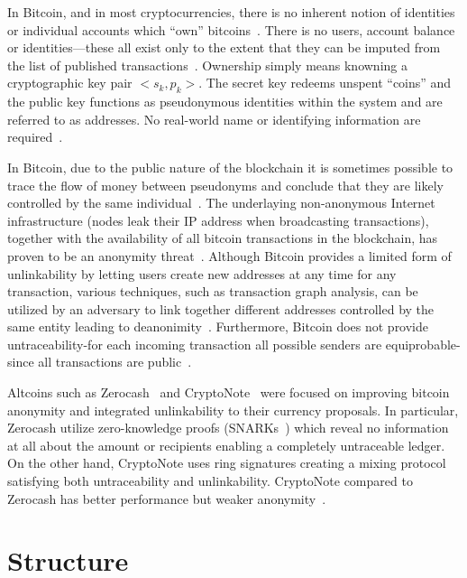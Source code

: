 In Bitcoin, and in most cryptocurrencies, there is no inherent notion of identities or individual accounts which “own” bitcoins~\cite{7163021,nakamoto2012bitcoin}.
There is no users, account balance or identities—these all exist only to the extent that they can be imputed from the list of published transactions~\cite{7163021,nakamoto2012bitcoin}.
Ownership simply means knowning a cryptographic key pair $<s_k, p_k>$. The secret key redeems unspent “coins” and the public key functions as pseudonymous
identities within the system and are referred to as addresses. No real-world name or identifying information are required~\cite{7163021,nakamoto2012bitcoin}.

In Bitcoin, due to the public nature of the blockchain it is sometimes possible to trace the flow of money between pseudonyms and conclude that they are likely controlled by the same
individual~\cite{7163021}. The underlaying non-anonymous Internet infrastructure (nodes leak their IP address when broadcasting transactions),
together with the availability of all bitcoin transactions in the blockchain, has proven to be an anonymity threat~\cite{10.1007/978-3-319-17016-9_1, 7163021,Meiklejohn:2013:FBC:2504730.2504747,6113303,10.1007/978-3-642-39884-1_2,fi5020237}.
Although Bitcoin provides a limited form of unlinkability by letting users create new addresses at any time for any
transaction, various techniques, such as transaction graph analysis, can be utilized by an adversary to link together different addresses controlled
by the same entity leading to deanonimity~\cite{7163021,Meiklejohn:2013:FBC:2504730.2504747,6113303,10.1007/978-3-642-39884-1_2,fi5020237}.
Furthermore, Bitcoin does not provide untraceability-for each incoming transaction all possible senders are equiprobable-since all transactions are public~\cite{cryptonote}.

Altcoins such as Zerocash~\cite{zcash} and CryptoNote~\cite{cryptonote} were focused on improving bitcoin anonymity and integrated unlinkability to their currency proposals.
In particular, Zerocash utilize zero-knowledge proofs (SNARKs~\cite{10.1007/978-3-642-40084-1_6}) which reveal no information at all about the amount or recipients enabling a completely untraceable ledger.
On the other hand, CryptoNote uses ring signatures creating a mixing protocol satisfying both untraceability and unlinkability. CryptoNote compared to Zerocash has better performance but weaker anonymity~\cite{7163021}.

\section{Structure}\label{blockchain:structure}

